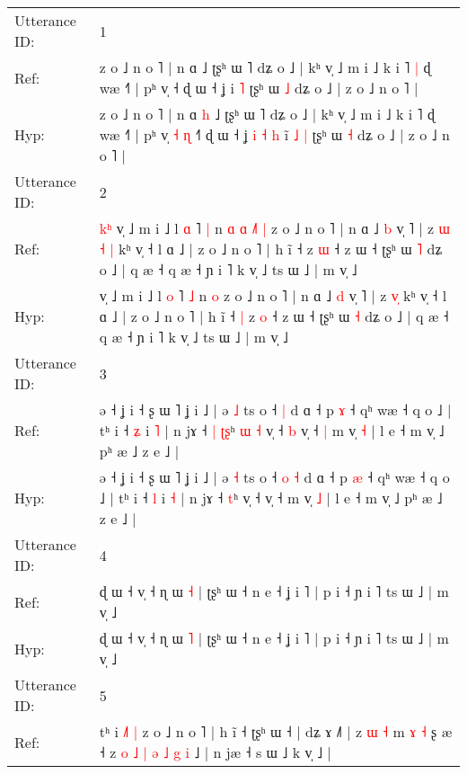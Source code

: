 \documentclass[10pt]{article}
\DeclareRobustCommand{\hl}[1]{{\textcolor{red}{#1}}}
\begin{document}
\begin{longtable}{ll}
\toprule
Utterance ID: & 1 \\
Ref: & z o ˩ n o ˥ | n ɑ\hl{}\hl{} ˩ ʈʂʰ ɯ ˥ dʑ o ˩ | kʰ v̩ ˩ m i ˩ k i ˥\hl{ }\hl{|} ɖ wæ ˧˥ | pʰ v̩\hl{}\hl{}\hl{}\hl{} ˧\hl{} ɖ ɯ ˧ ʝ\hl{}\hl{}\hl{}\hl{}\hl{}\hl{} i\hl{}\hl{}\hl{} \hl{˥} ʈʂʰ ɯ \hl{˩} dʑ o ˩ | z o ˩ n o ˥ |
 \\
Hyp: & z o ˩ n o ˥ | n ɑ\hl{ }\hl{h} ˩ ʈʂʰ ɯ ˥ dʑ o ˩ | kʰ v̩ ˩ m i ˩ k i ˥\hl{}\hl{} ɖ wæ ˧˥ | pʰ v̩\hl{ }\hl{˧}\hl{ }\hl{ɳ} ˧\hl{˥} ɖ ɯ ˧ ʝ\hl{ }\hl{i}\hl{ }\hl{˧}\hl{ }\hl{h} i\hl{̃}\hl{ }\hl{˩} \hl{|} ʈʂʰ ɯ \hl{˧} dʑ o ˩ | z o ˩ n o ˥ |
 \\
\midrule
Utterance ID: & 2 \\
Ref: & \hl{k}\hl{ʰ}\hl{ }v̩ ˩ m i ˩ l \hl{ɑ} ˥ \hl{|} n\hl{ }\hl{ɑ}\hl{ }\hl{ɑ}\hl{ }\hl{˩}\hl{˥} \hl{|} z o ˩ n o ˥ | n ɑ ˩ \hl{b} v̩ ˥ | z\hl{ }\hl{ɯ} \hl{˧}\hl{ }\hl{|} kʰ v̩ ˧ l ɑ ˩ | z o ˩ n o ˥ | h ĩ ˧\hl{}\hl{} z \hl{ɯ} ˧ z ɯ ˧ ʈʂʰ ɯ \hl{˥} dʑ o ˩ | q æ ˧ q æ ˧ ɲ i ˥ k v̩ ˩ ts ɯ ˩ | m v̩ ˩
 \\
Hyp: & \hl{}\hl{}\hl{}v̩ ˩ m i ˩ l \hl{o} ˥ \hl{˩} n\hl{}\hl{}\hl{}\hl{}\hl{}\hl{}\hl{} \hl{o} z o ˩ n o ˥ | n ɑ ˩ \hl{d} v̩ ˥ | z\hl{}\hl{} \hl{}\hl{v}\hl{̩} kʰ v̩ ˧ l ɑ ˩ | z o ˩ n o ˥ | h ĩ ˧\hl{ }\hl{|} z \hl{o} ˧ z ɯ ˧ ʈʂʰ ɯ \hl{˧} dʑ o ˩ | q æ ˧ q æ ˧ ɲ i ˥ k v̩ ˩ ts ɯ ˩ | m v̩ ˩
 \\
\midrule
Utterance ID: & 3 \\
Ref: & ə ˧ ʝ i ˧ ʂ ɯ ˥ ʝ i ˩ | ə \hl{˩} ts o ˧\hl{}\hl{} \hl{|} d ɑ ˧ p \hl{ɤ} ˧ qʰ wæ ˧ q o ˩ | tʰ i ˧ \hl{ʑ} i \hl{˥} | n jɤ ˧\hl{ }\hl{|} \hl{ʈ}\hl{ʂ}ʰ\hl{ }\hl{ɯ}\hl{ }\hl{˧} v̩ ˧\hl{ }\hl{b} v̩ ˧\hl{ }\hl{|} m v̩ \hl{˧} | l e ˧ m v̩ ˩ pʰ æ ˩ z e ˩ |
 \\
Hyp: & ə ˧ ʝ i ˧ ʂ ɯ ˥ ʝ i ˩ | ə \hl{˧} ts o ˧\hl{ }\hl{o} \hl{˧} d ɑ ˧ p \hl{æ} ˧ qʰ wæ ˧ q o ˩ | tʰ i ˧ \hl{l} i \hl{˧} | n jɤ ˧\hl{}\hl{} \hl{}\hl{t}ʰ\hl{}\hl{}\hl{}\hl{} v̩ ˧\hl{}\hl{} v̩ ˧\hl{}\hl{} m v̩ \hl{˩} | l e ˧ m v̩ ˩ pʰ æ ˩ z e ˩ |
 \\
\midrule
Utterance ID: & 4 \\
Ref: & ɖ ɯ ˧ v̩ ˧ ɳ ɯ \hl{˧} | ʈʂʰ ɯ ˧ n e ˧ ʝ i ˥ | p i ˧ ɲ i ˥ ts ɯ ˩ | m v̩ ˩
 \\
Hyp: & ɖ ɯ ˧ v̩ ˧ ɳ ɯ \hl{˥} | ʈʂʰ ɯ ˧ n e ˧ ʝ i ˥ | p i ˧ ɲ i ˥ ts ɯ ˩ | m v̩ ˩
 \\
\midrule
Utterance ID: & 5 \\
Ref: & tʰ i\hl{ }\hl{˩}\hl{˥}\hl{ }\hl{|} z o ˩ n o ˥ | h ĩ ˧ ʈʂʰ ɯ ˧ | dʑ ɤ ˩˥ | z \hl{ɯ} \hl{˧} m \hl{ɤ} \hl{˧} ʂ æ ˧ z\hl{ }\hl{o} \hl{˩} \hl{|} \hl{ə} \hl{˩}\hl{ }\hl{g} \hl{i} ˩ | n jæ ˧ s ɯ ˩ k v̩ ˩ |

\end{longtable}
\end{document}
